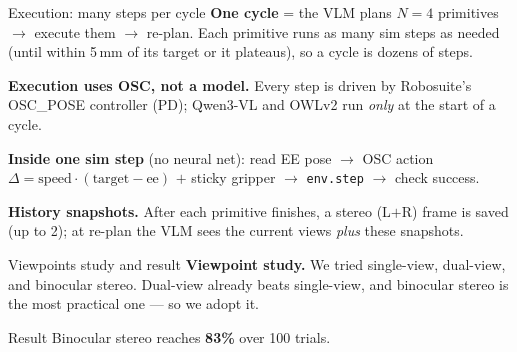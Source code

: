 \documentclass[aspectratio=169,10pt]{beamer}
\begin{document}
\begin{frame}{Execution: many steps per cycle}
\textbf{One cycle} = the VLM plans $N{=}4$ primitives $\to$ execute them $\to$ re-plan. Each primitive runs as many \alert{sim steps} as needed (until within 5\,mm of its target or it plateaus), so a cycle is dozens of steps.
\vspace{6pt}

\textbf{Execution uses OSC, not a model.} Every step is driven by Robosuite's \alert{OSC\_POSE} controller (PD); Qwen3-VL and OWLv2 run \emph{only} at the start of a cycle.
\vspace{6pt}

\textbf{Inside one sim step} (\alert{no neural net}): read EE pose $\to$ OSC action $\Delta=\text{speed}\cdot(\text{target}{-}\text{ee})$ $+$ sticky gripper $\to$ \texttt{env.step} $\to$ check success.
\vspace{6pt}

\textbf{History snapshots.} After each primitive finishes, a stereo (L$+$R) frame is saved (up to 2); at re-plan the VLM sees the current views \emph{plus} these snapshots.
\end{frame}

\begin{frame}{Viewpoints study and result}
\textbf{Viewpoint study.} We tried single-view, dual-view, and binocular stereo. Dual-view already beats single-view, and \alert{binocular stereo is the most practical one} --- so we adopt it.
\vspace{4pt}

\vspace{6pt}

\begin{block}{Result}
Binocular stereo reaches \alert{\textbf{83\%}} over \alert{100} trials.
\end{block}
\end{frame}
\end{document}
